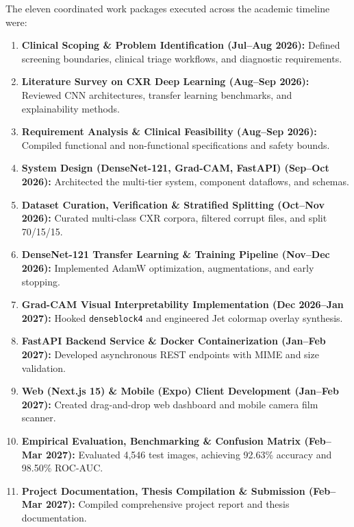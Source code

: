 \documentclass[12pt,a4paper]{report}
\begin{document}
The eleven coordinated work packages executed across the academic timeline were:
\begin{enumerate}
    \item \textbf{Clinical Scoping \& Problem Identification (Jul--Aug 2026):} Defined screening boundaries, clinical triage workflows, and diagnostic requirements.
    \item \textbf{Literature Survey on CXR Deep Learning (Aug--Sep 2026):} Reviewed CNN architectures, transfer learning benchmarks, and explainability methods.
    \item \textbf{Requirement Analysis \& Clinical Feasibility (Aug--Sep 2026):} Compiled functional and non-functional specifications and safety bounds.
    \item \textbf{System Design (DenseNet-121, Grad-CAM, FastAPI) (Sep--Oct 2026):} Architected the multi-tier system, component dataflows, and schemas.
    \item \textbf{Dataset Curation, Verification \& Stratified Splitting (Oct--Nov 2026):} Curated multi-class CXR corpora, filtered corrupt files, and split 70/15/15.
    \item \textbf{DenseNet-121 Transfer Learning \& Training Pipeline (Nov--Dec 2026):} Implemented AdamW optimization, augmentations, and early stopping.
    \item \textbf{Grad-CAM Visual Interpretability Implementation (Dec 2026--Jan 2027):} Hooked \texttt{denseblock4} and engineered Jet colormap overlay synthesis.
    \item \textbf{FastAPI Backend Service \& Docker Containerization (Jan--Feb 2027):} Developed asynchronous REST endpoints with MIME and size validation.
    \item \textbf{Web (Next.js 15) \& Mobile (Expo) Client Development (Jan--Feb 2027):} Created drag-and-drop web dashboard and mobile camera film scanner.
    \item \textbf{Empirical Evaluation, Benchmarking \& Confusion Matrix (Feb--Mar 2027):} Evaluated 4,546 test images, achieving 92.63\% accuracy and 98.50\% ROC-AUC.
    \item \textbf{Project Documentation, Thesis Compilation \& Submission (Feb--Mar 2027):} Compiled comprehensive project report and thesis documentation.
\end{enumerate}


\end{document}
